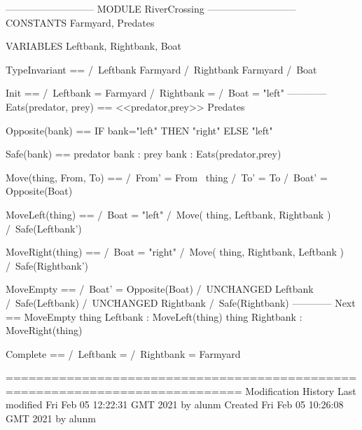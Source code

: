 \documentclass{article}
\begin{document}
\begin{tla}
--------------------------- MODULE RiverCrossing ---------------------------
CONSTANTS Farmyard,
          Predates

VARIABLES Leftbank,
          Rightbank,
          Boat

TypeInvariant ==
          /\ Leftbank \subseteq Farmyard
          /\ Rightbank \subseteq Farmyard
          /\ Boat 

Init == 
          /\ Leftbank = Farmyard
          /\ Rightbank = {}
          /\ Boat =  "left"
------------
Eats(predator, prey) == <<predator,prey>> \in Predates

Opposite(bank) == IF bank="left" THEN "right" ELSE "left"

Safe(bank) == \lnot \E predator \in bank : 
                    \E prey \in bank : Eats(predator,prey)

Move(thing, From, To) == 
          /\ From' = From \ {thing}
          /\ To'   = To 
          /\ Boat' = Opposite(Boat)

MoveLeft(thing) ==
          /\ Boat = "left"
          /\ Move( thing, Leftbank, Rightbank )
          /\ Safe(Leftbank')

MoveRight(thing) == 
          /\ Boat = "right"
          /\ Move( thing, Rightbank, Leftbank )
          /\ Safe(Rightbank')

MoveEmpty ==
          /\ Boat' = Opposite(Boat)
          /\ UNCHANGED Leftbank /\ Safe(Leftbank)
          /\ UNCHANGED Rightbank /\ Safe(Rightbank)
------------
Next == 
          \/ MoveEmpty
          \/ \E thing \in Leftbank : MoveLeft(thing) 
          \/ \E thing \in Rightbank : MoveRight(thing) 

Complete == 
          /\ Leftbank = {}
          /\ Rightbank = Farmyard

=============================================================================
\* Modification History
\* Last modified Fri Feb 05 12:22:31 GMT 2021 by alunm
\* Created Fri Feb 05 10:26:08 GMT 2021 by alunm
\end{tla}
\end{document}
